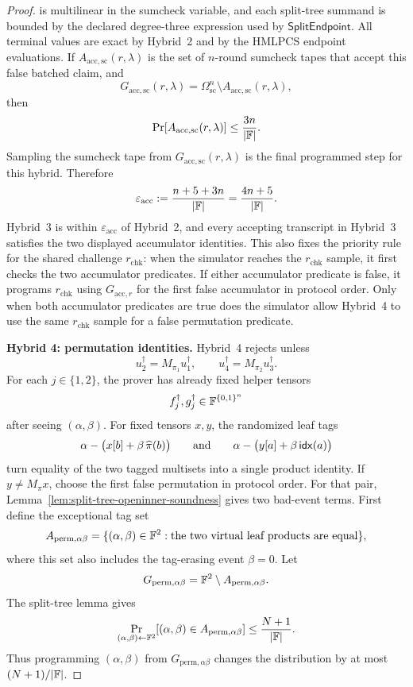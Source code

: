 \begin{proof}
is multilinear in the sumcheck variable, and each split-tree summand is bounded
by the declared degree-three expression used by
\(\mathsf{SplitEndpoint}\).  All terminal values are exact by Hybrid~2 and by
the HMLPCS endpoint evaluations.  If
\(A_{\mathrm{acc},\mathrm{sc}}(r,\lambda)\) is the set of \(n\)-round sumcheck
tapes that accept this false batched claim, and
\[
  G_{\mathrm{acc},\mathrm{sc}}(r,\lambda)
  =
  \Omega_{\mathrm{sc}}^n\setminus
  A_{\mathrm{acc},\mathrm{sc}}(r,\lambda),
\]
then
\[
  \Pr[A_{\mathrm{acc},\mathrm{sc}}(r,\lambda)]
  \le \frac{3n}{|\mathbb{F}|}.
\]
Sampling the sumcheck tape from
\(G_{\mathrm{acc},\mathrm{sc}}(r,\lambda)\) is the final programmed step for
this hybrid.  Therefore
\[
  \varepsilon_{\mathrm{acc}}
  :=
  \frac{n+5+3n}{|\mathbb{F}|}
  =
  \frac{4n+5}{|\mathbb{F}|}.
\]
Hybrid~3 is within
\(\varepsilon_{\mathrm{acc}}\) of Hybrid~2, and every accepting transcript in
Hybrid~3 satisfies the two displayed accumulator identities.  This also fixes
the priority rule for the shared challenge \(r_{\mathrm{chk}}\): when the
simulator reaches the \(r_{\mathrm{chk}}\) sample, it first checks the two
accumulator predicates.  If either accumulator predicate is false, it programs
\(r_{\mathrm{chk}}\) using \(G_{\mathrm{acc},r}\) for the first false
accumulator in protocol order.  Only when both accumulator predicates are true
does the simulator allow Hybrid~4 to use the same \(r_{\mathrm{chk}}\) sample
for a false permutation predicate.

\smallskip\noindent\textbf{Hybrid 4: permutation identities.}
Hybrid~4 rejects unless
\[
  u_2^\dagger=M_{\pi_1}u_1^\dagger,
  \qquad
  u_4^\dagger=M_{\pi_2}u_3^\dagger.
\]
For each \(j\in\{1,2\}\), the prover has already fixed helper tensors
\[
  f_j^\dagger,g_j^\dagger\in\mathbb{F}^{\{0,1\}^n}
\]
after seeing \((\alpha,\beta)\).  For fixed tensors \(x,y\), the randomized
leaf tags
\[
  \alpha-\bigl(x[b]+\beta\,\widehat\pi(b)\bigr)
  \qquad\text{and}\qquad
  \alpha-\bigl(y[a]+\beta\,\mathsf{idx}(a)\bigr)
\]
turn equality of the two tagged multisets into a single product identity.  If
\(y\ne M_\pi x\), choose the first false permutation in protocol order.  For
that pair, Lemma~\ref{lem:split-tree-openinner-soundness} gives two bad-event
terms.  First define the exceptional tag set
\[
  A_{\mathrm{perm},\alpha\beta}
  =
  \{(\alpha,\beta)\in\mathbb{F}^2:
      \text{the two virtual leaf products are equal}\},
\]
where this set also includes the tag-erasing event \(\beta=0\).  Let
\[
  G_{\mathrm{perm},\alpha\beta}
  =
  \mathbb{F}^2\setminus A_{\mathrm{perm},\alpha\beta}.
\]
The split-tree lemma gives
\[
  \Pr_{(\alpha,\beta)\leftarrow\mathbb{F}^2}
    [(\alpha,\beta)\in A_{\mathrm{perm},\alpha\beta}]
  \le
  \frac{N+1}{|\mathbb{F}|}.
\]
Thus programming \((\alpha,\beta)\) from
\(G_{\mathrm{perm},\alpha\beta}\) changes the distribution by at most
\((N+1)/|\mathbb{F}|\).


\end{proof}
